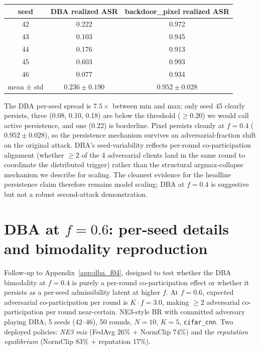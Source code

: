 \documentclass{article}
\begin{document}
\begin{center}\small
\begin{tabular}{c|cc}
\toprule
seed & DBA realized ASR & backdoor\_pixel realized ASR \\
\midrule
42 & 0.222 & 0.972 \\
43 & 0.103 & 0.945 \\
44 & 0.176 & 0.913 \\
45 & 0.603 & 0.993 \\
46 & 0.077 & 0.934 \\
\midrule
mean ± std & $0.236 \pm 0.190$ & $0.952 \pm 0.028$ \\
\bottomrule
\end{tabular}
\end{center}

The DBA per-seed spread is $7.5\times$ between min and max; only seed 45 clearly persists, three (0.08, 0.10, 0.18) are below the threshold ($\geq 0.20$) we would call active persistence, and one (0.22) is borderline. Pixel persists cleanly at $f{=}0.4$ ($0.952 \pm 0.028$), so the persistence mechanism survives an adversarial-fraction shift on the original attack. DBA's seed-variability reflects per-round co-participation alignment (whether $\geq 2$ of the 4 adversarial clients land in the same round to coordinate the distributed trigger) rather than the structural argmax-collapse mechanism we describe for scaling. The cleanest evidence for the headline persistence claim therefore remains model scaling; DBA at $f{=}0.4$ is suggestive but not a robust second-attack demonstration.

\section{DBA at $f{=}0.6$: per-seed details and bimodality reproduction}
\label{app:dba_f06}

Follow-up to Appendix~\ref{app:dba_f04}, designed to test whether the DBA bimodality at $f{=}0.4$ is purely a per-round co-participation effect or whether it persists as a per-seed admissibility latent at higher $f$. At $f{=}0.6$, expected adversarial co-participation per round is $K \cdot f = 3.0$, making $\geq 2$ adversarial co-participation per round near-certain. NE3-style BR with committed adversary playing DBA; 5 seeds (42--46), 50 rounds, $N{=}10$, $K{=}5$, \texttt{cifar\_cnn}. Two deployed policies: \emph{NE3 mix} (FedAvg $26\%$ + NormClip $74\%$) and the \emph{reputation equilibrium} (NormClip $83\%$ + reputation $17\%$).
\end{document}
